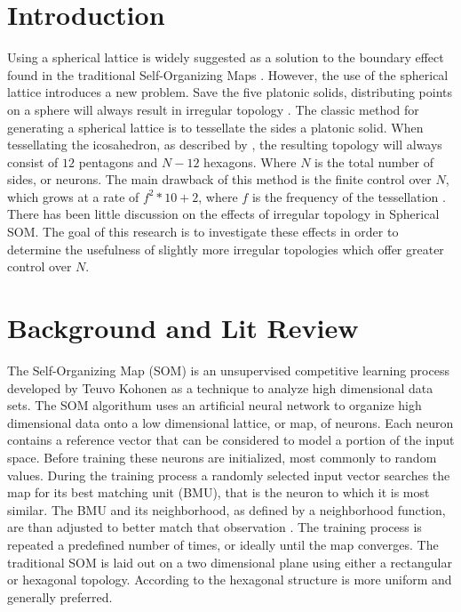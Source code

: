\documentclass[11pt]{article}
\begin{document}
\section{Introduction}
Using a spherical lattice is widely suggested as a solution to the boundary
effect found in the traditional Self-Organizing Maps \citep{ritter99, boudjemai2003,
sangole03, Wu:2006lr, Nishio:2006fk}.  However, the use of the spherical lattice
introduces a new problem.  Save the five platonic solids, distributing points on
a sphere will always result in irregular topology \citep{ritter99}.  The classic
method for generating a spherical lattice is to tessellate the sides a platonic
solid.  When tessellating the icosahedron, as described by \cite{Wu:2006lr}, the
resulting topology will always consist of \(12\) pentagons and \(N-12\) hexagons.
Where \(N\) is the total number of sides, or neurons.  The main drawback of this
method is the finite control over \(N\), which grows at a rate of \(f^2*10+2\),
where \(f\) is the frequency of the tessellation \citep{Wu:2006lr}.  There has been
little discussion on the effects of irregular topology in Spherical SOM. The goal of
this research is to investigate these effects in order to determine the usefulness of
slightly more irregular topologies which offer greater control over \(N\).

\section{Background and Lit Review}
The Self-Organizing Map (SOM) is an unsupervised competitive learning process
developed by Teuvo Kohonen as a technique to analyze high dimensional data sets.
The SOM algorithum uses an artificial neural network to organize high
dimensional data onto a low dimensional lattice, or map, of neurons.  Each
neuron contains a reference vector that can be considered to model a portion of
the input space. Before training these neurons are initialized, most commonly to
random values.  During the training process a randomly selected input vector
searches the map for its best matching unit (BMU), that is the neuron to which
it is most similar. The BMU and its neighborhood, as defined by a neighborhood
function, are than adjusted to better match that observation
\citep{Kohonen2000}.  The training process is repeated a predefined number of
times, or ideally until the map converges.  The traditional SOM is laid out on a
two dimensional plane using either a rectangular or hexagonal topology.
According to \cite{Wu:2006lr} the hexagonal structure is more uniform and
generally preferred.
\end{document}
